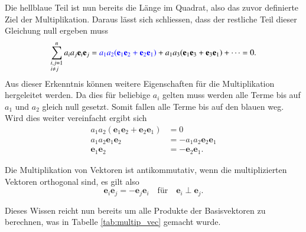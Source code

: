 Die hellblaue Teil ist nun bereits die Länge im Quadrat, also das zuvor definierte Ziel der Multiplikation. 
Daraus lässt sich schliessen, dass der restliche Teil dieser Gleichung null ergeben muss
\begin{equation}
    \label{eq:Mischterme_Null}
    \sum_{\begin{subarray}{l}i,j=1\\i \neq j\end{subarray}}^n  a_ia_j\textbf{e}_i\textbf{e}_j  = \textcolor{blue}{a_1a_2(\textbf{e}_1\textbf{e}_2 + \textbf{e}_2\textbf{e}_1)} + a_1a_3(\textbf{e}_1\textbf{e}_3 + \textbf{e}_3\textbf{e}_1) + \dots =  0.
\end{equation}
Aus dieser Erkenntnis können weitere Eigenschaften für die Multiplikation hergeleitet werden.
Da dies für beliebige $a_i$ gelten muss werden alle Terme bis auf $a_1$ und $a_2$ gleich null gesetzt. Somit fallen alle Terme bis auf den blauen weg. Wird dies weiter vereinfacht ergibt sich
\begin{equation}
\begin{split}
    a_1a_2(\textbf{e}_1\textbf{e}_2 + \textbf{e}_2\textbf{e}_1) &= 0 \\
    a_1a_2\textbf{e}_1\textbf{e}_2 &= -a_1a_2\textbf{e}_2\textbf{e}_1 \\
    \textbf{e}_1\textbf{e}_2 &= -\textbf{e}_2\textbf{e}_1.
\end{split}
\end{equation}
\begin{satz}
  Die Multiplikation von Vektoren ist antikommutativ, wenn die multiplizierten Vektoren orthogonal sind, es gilt also
    \begin{equation}
        \textbf{e}_i\textbf{e}_j = -\textbf{e}_j\textbf{e}_i \quad \textrm{für} \quad \textbf{e}_i \perp \textbf{e}_j.
    \end{equation}
\end{satz}
Dieses Wissen reicht nun bereits um alle Produkte der Basisvektoren zu berechnen, was in Tabelle \ref{tab:multip_vec} gemacht wurde.
